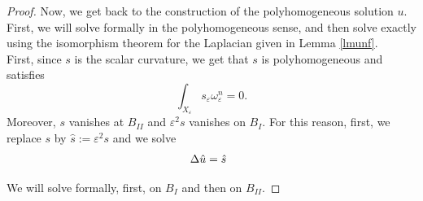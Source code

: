 \documentclass[a4paper,11pt]{article}
\begin{document}
\begin{proof}
    Now, we get back to the construction of the polyhomogeneous solution $u$. First, we will solve formally in the polyhomogeneous sense, and then solve exactly using the isomorphism theorem for the Laplacian given in Lemma \ref{lmunf}. \\

    First, since $s$ is the scalar curvature, we get that $s$ is polyhomogeneous and satisfies
    $$
    \int_{X_\varepsilon} s_\varepsilon \omega_\varepsilon^n =0.
    $$
    Moreover, $s$ vanishes at $B_{II}$ and $\varepsilon^2 s$ vanishes on $B_I$. For this reason, first, we replace $s$ by $\hat s := \varepsilon^2 s$ and we solve 
\begin{align} \label{linpot2}
    \Delta \hat u = \hat s \hspace{0.1cm} \hspace{0.1cm} 
\end{align}
    
    We will solve formally, first, on $B_{I}$ and then on $B_{II}$. 


\end{proof}
\end{document}
